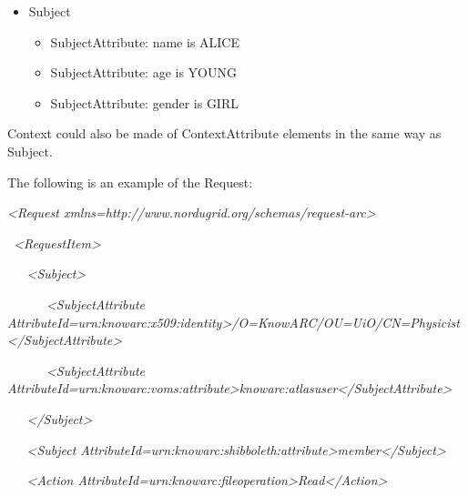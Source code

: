 \documentclass[a4paper]{article}
\newcommand\liststyleWWviiiNumxviii{%
\renewcommand\labelitemi{o}
\renewcommand\labelitemii{o}
\renewcommand\labelitemiii{[F0A7?]}
\renewcommand\labelitemiv{[F0B7?]}
}
\begin{document}
\liststyleWWviiiNumxviii
\begin{itemize}
\item {\color{black}
Subject}

\begin{itemize}
\item {\color{black}
SubjectAttribute: name is ALICE}
\item {\color{black}
SubjectAttribute: age is YOUNG}
\item {\color{black}
SubjectAttribute: gender is GIRL}
\end{itemize}
\end{itemize}
{\color{black}
Context could also be made of ContextAttribute elements in the same way
as Subject.}

{\color{black}
The following is an example of the Request:}

{\itshape\color{black}
{\textless}Request
xmlns={\textquotedbl}http://www.nordugrid.org/schemas/request-arc{\textquotedbl}{\textgreater}}

{\itshape\color{black}
\ {\textless}RequestItem{\textgreater}}

{\itshape\color{black}
\ \ \ {\textless}Subject{\textgreater}}

{\itshape\color{black}
\ \ \ \ \ \ {\textless}SubjectAttribute
AttributeId={\textquotedbl}urn:knowarc:x509:identity{\textquotedbl}{\textgreater}/O=KnowARC/OU=UiO/CN=Physicist{\textless}/SubjectAttribute{\textgreater}}

{\itshape\color{black}
\ \ \ \ \ \ {\textless}SubjectAttribute
AttributeId={\textquotedbl}urn:knowarc:voms:attribute{\textgreater}knowarc:atlasuser{\textless}/SubjectAttribute{\textgreater}}

{\itshape\color{black}
\ \ \ {\textless}/Subject{\textgreater}}

{\itshape\color{black}
\ \ \ {\textless}Subject
AttributeId={\textquotedbl}urn:knowarc:shibboleth:attribute{\textquotedbl}{\textgreater}member{\textless}/Subject{\textgreater}}

{\itshape\color{black}
\ \ \ {\textless}Action
AttributeId={\textquotedbl}urn:knowarc:fileoperation{\textquotedbl}{\textgreater}Read{\textless}/Action{\textgreater}}
\end{document}
